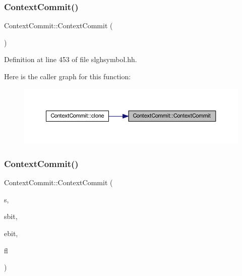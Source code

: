 \subsubsection{\texorpdfstring{ContextCommit()}{ContextCommit()}\hspace{0.1cm}{\footnotesize\ttfamily [1/2]}}
{\footnotesize\ttfamily Context\+Commit\+::\+Context\+Commit (\begin{DoxyParamCaption}\item[{void}]{ }\end{DoxyParamCaption})\hspace{0.3cm}{\ttfamily [inline]}}



Definition at line 453 of file slghsymbol.\+hh.

Here is the caller graph for this function\+:
\nopagebreak
\begin{figure}[H]
\begin{center}
\leavevmode
\includegraphics[width=350pt]{class_context_commit_a7eaef6830515b4c92f44bff42004ff16_icgraph}
\end{center}
\end{figure}
\mbox{\label{class_context_commit_a751263f546f0f883d2c31fb6bc4cfac0}} 
\subsubsection{\texorpdfstring{ContextCommit()}{ContextCommit()}\hspace{0.1cm}{\footnotesize\ttfamily [2/2]}}
{\footnotesize\ttfamily Context\+Commit\+::\+Context\+Commit (\begin{DoxyParamCaption}\item[{\mbox{\hyperlink{class_triple_symbol}{Triple\+Symbol}} $\ast$}]{s,  }\item[{int4}]{sbit,  }\item[{int4}]{ebit,  }\item[{bool}]{fl }\end{DoxyParamCaption})}



